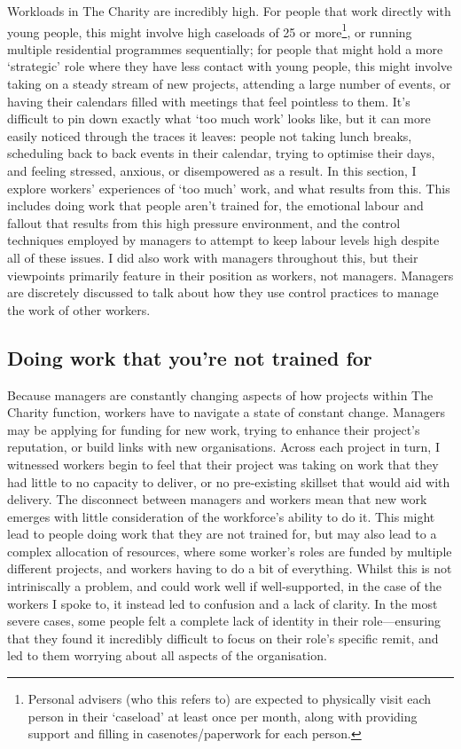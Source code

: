 Workloads in The Charity are incredibly high. For people that work directly with young people, this might involve high caseloads of 25 or more\footnote{Personal advisers (who this refers to) are expected to physically visit each person in their `caseload' at least once per month, along with providing support and filling in casenotes/paperwork for each person. }, or running multiple residential programmes sequentially; for people that might hold a more ‘strategic’ role where they have less contact with young people, this might involve taking on a steady stream of new projects, attending a large number of events, or having their calendars filled with meetings that feel pointless to them. It’s difficult to pin down exactly  what ‘too much work’ looks like, but it can more easily noticed through the traces it leaves: people not taking lunch breaks, scheduling back to back events in their calendar, trying to optimise their days, and feeling stressed, anxious, or disempowered as a result. In this section, I explore workers' experiences of `too much' work, and what results from this. This includes doing work that people aren’t trained for, the emotional labour and fallout that results from this high pressure environment, and the control techniques employed by managers to attempt to keep labour levels high despite all of these issues. I did also work with managers throughout this, but their viewpoints primarily feature in their position as workers, not managers. Managers are discretely discussed to talk about how they use control practices to manage the work of other workers.

\subsection{Doing work that you’re not trained for}
Because managers are constantly changing aspects of how projects within The Charity function, workers have to navigate a state of constant change. Managers may be applying for funding for new work, trying to enhance their project’s reputation, or build links with new organisations. Across each project in turn, I witnessed workers begin to feel that their project was taking on work that they had little to no capacity to deliver, or no pre-existing skillset that would aid with delivery. The disconnect between managers and workers mean that new work emerges with little consideration of the workforce's ability to do it. This might lead to people doing work that they are not trained for, but may also lead to a complex allocation of resources, where some worker's roles are funded by multiple different projects, and workers having to do a bit of everything. Whilst this is not intriniscally a problem, and could work well if well-supported, in the case of the workers I spoke to, it instead led to confusion and a lack of clarity. In the most severe cases, some people felt a complete lack of identity in their role—ensuring that they found it incredibly difficult to focus on their role's specific remit, and led to them worrying about all aspects of the organisation.

